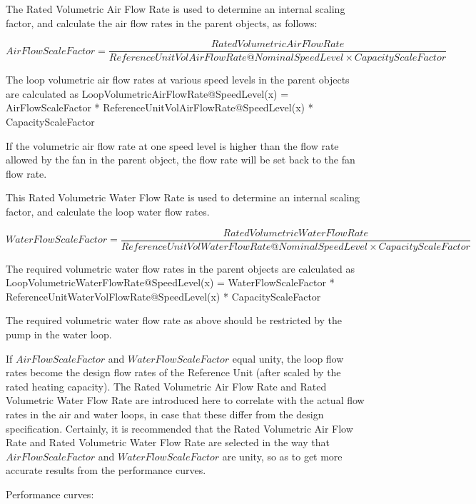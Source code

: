 The Rated Volumetric Air Flow Rate is used to determine an internal scaling factor, and calculate the air flow rates in the parent objects, as follows:

{\scriptsize
\begin{equation}
AirFlowScaleFactor = \frac{{RatedVolumetricAirFlowRate}}{{ReferenceUnitVolAirFlowRate@NominalSpeedLevel \times CapacityScaleFactor}}
\end{equation}}

The loop volumetric air flow rates at various speed levels in the parent objects are calculated as LoopVolumetricAirFlowRate@SpeedLevel(x) = AirFlowScaleFactor * ReferenceUnitVolAirFlowRate@SpeedLevel(x) * CapacityScaleFactor

If the volumetric air flow rate at one speed level is higher than the flow rate allowed by the fan in the parent object, the flow rate will be set back to the fan flow rate.

This Rated Volumetric Water Flow Rate is used to determine an internal scaling factor, and calculate the loop water flow rates.

{\scriptsize
\begin{equation}
WaterFlowScaleFactor = \frac{{RatedVolumetricWaterFlowRate}}{{ReferenceUnitVolWaterFlowRate@NominalSpeedLevel \times CapacityScaleFactor}}
\end{equation}}

The required volumetric water flow rates in the parent objects are calculated as LoopVolumetricWaterFlowRate@SpeedLevel(x) = WaterFlowScaleFactor * ReferenceUnitWaterVolFlowRate@SpeedLevel(x) * CapacityScaleFactor

The required volumetric water flow rate as above should be restricted by the pump in the water loop.

If \(AirFlowScaleFactor\) and \(WaterFlowScaleFactor\) equal unity, the loop flow rates become the design flow rates of the Reference Unit (after scaled by the rated heating capacity). The Rated Volumetric Air Flow Rate and Rated Volumetric Water Flow Rate are introduced here to correlate with the actual flow rates in the air and water loops, in case that these differ from the design specification. Certainly, it is recommended that the Rated Volumetric Air Flow Rate and Rated Volumetric Water Flow Rate are selected in the way that \(AirFlowScaleFactor\) and \(WaterFlowScaleFactor\) are unity, so as to get more accurate results from the performance curves.

Performance curves:

